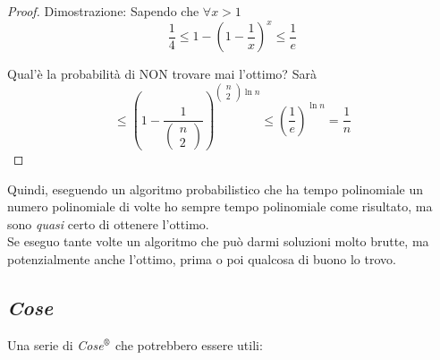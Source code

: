 \begin{proof}
	Dimostrazione: Sapendo che $\forall x >1$
	$$ \frac{1}{4} \leq1 - \left( 1 - \frac{1}{x}\right)^x \leq \frac{1}{e}$$
	
	Qual'è la probabilità di NON trovare mai l'ottimo? Sarà
	$$ \leq \left(1 - \frac{1}{\left(\begin{array}{c} n \\ 2 \end{array}\right)}\right)^{\left(\begin{array}{c} n \\ 2 \end{array}\right) \ln n} 
	\leq \left(\frac{1}{e}\right)^{\ln n} 
	= \frac{1}{n}
	$$
\end{proof}

Quindi, eseguendo un algoritmo probabilistico che ha tempo polinomiale un numero polinomiale di volte ho sempre tempo polinomiale come risultato, ma sono \textit{quasi} certo di ottenere l'ottimo.\\

Se eseguo tante volte un algoritmo che può darmi soluzioni molto brutte, ma potenzialmente anche l'ottimo, prima o poi qualcosa di buono lo trovo.\\


\newpage

\subsection*{\textit{Cose}}

Una serie di \textit{Cose}$^\text{\textregistered}$ che potrebbero essere utili: 

